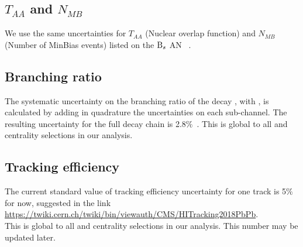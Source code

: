 \clearpage

\subsection{$T_{AA}$ and $N_{MB}$}
We use the same uncertainties for $T_{AA}$ (Nuclear overlap function) and $N_{MB}$ (Number of MinBias events) listed on the $\mathrm{B}_{s}$ AN ~\cite{AN-19-055}.

\subsection{Branching ratio}
The systematic uncertainty on the branching ratio of the decay \Bplusdecay, with \Jpsidecay, is calculated by adding in quadrature the uncertainties on each sub-channel. The resulting uncertainty for the full decay chain is 2.8$\%$~\cite{PDG:2018}. This is global to all \pt and centrality selections in our analysis.

\subsection{Tracking efficiency}
The current standard value of tracking efficiency uncertainty for one track is 5$\%$ for now, suggested in the link 
\url{https://twiki.cern.ch/twiki/bin/viewauth/CMS/HITracking2018PbPb}. \\
This is global to all \pt and centrality selections in our analysis. This number may be updated later.

